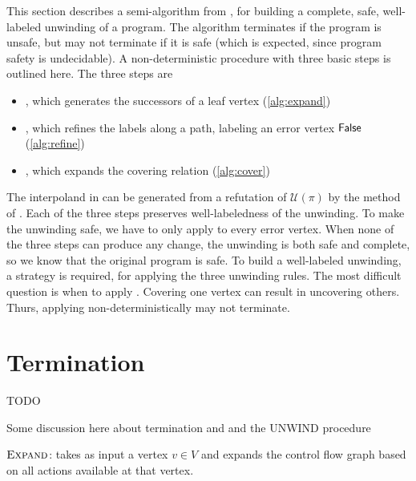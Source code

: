 \label{ch:impact-algorithm}
%

This section describes a semi-algorithm from \cite{mcmillan06}, for building a complete, safe, well-labeled unwinding of a program. The algorithm terminates if the program is unsafe, but may not terminate if it is safe (which is expected, since program safety is undecidable). A non-deterministic procedure with three basic steps is outlined here. The three steps are

\begin{itemize}
  \item \expand, which generates the successors of a leaf vertex (\autoref{alg:expand})
  \item {}, which refines the labels along a path, labeling an error vertex $\mathsf{False}$ (\autoref{alg:refine})
  \item \cover, which expands the covering relation (\autoref{alg:cover})
\end{itemize}

The interpoland in  can be generated from a refutation of $\mathcal{U}(\pi)$ by the method of \cite{mcmillan05}. Each of the three steps preserves well-labeledness of the unwinding. To make the unwinding safe, we have to only apply  to every error vertex. When none of the three steps can produce any change, the unwinding is both safe and complete, so we know that the original program is safe.
To build a well-labeled unwinding, a strategy is required, for applying the three unwinding rules. The most difficult question is when to apply \cover. Covering one vertex can result in uncovering others. Thurs, applying \cover non-deterministically may not terminate.

\section{Termination}
TODO

Some discussion here about termination and and the UNWIND procedure

\begin{algorithm}[ht]


  \caption{$\textsc{Expand}$: takes as input a vertex $v \in V$ and expands the control flow graph based on all actions available at that vertex.}
  \label{alg:expand}
\end{algorithm}

